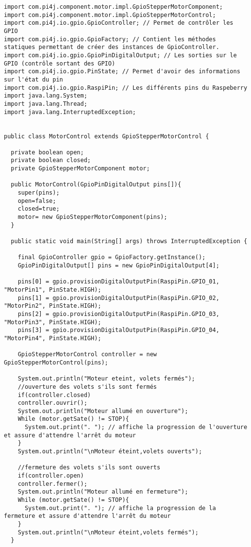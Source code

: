 \documentclass{article}
\newenvironment{DDbox}[1]{
\begin{lrbox}{\BBbox}\begin{minipage}{\linewidth}}
{\end{minipage}\end{lrbox}\noindent\colorbox{Zgris}{\usebox{\BBbox}} \\
[.5cm]}
\begin{document}
\begin{DDbox}{\linewidth}
\begin{lstlisting}
import com.pi4j.component.motor.impl.GpioStepperMotorComponent;
import com.pi4j.component.motor.impl.GpioStepperMotorControl;
import com.pi4j.io.gpio.GpioController; // Permet de contrôler les GPIO
import com.pi4j.io.gpio.GpioFactory; // Contient les méthodes statiques permettant de créer des instances de GpioController.
import com.pi4j.io.gpio.GpioPinDigitalOutput; // Les sorties sur le GPIO (contrôle sortant des GPIO)
import com.pi4j.io.gpio.PinState; // Permet d'avoir des informations sur l'état du pin
import com.pi4j.io.gpio.RaspiPin; // Les différents pins du Raspeberry
import java.lang.System;
import java.lang.Thread;
import java.lang.InterruptedException;


public class MotorControl extends GpioStepperMotorControl {

  private boolean open;
  private boolean closed;
  private GpioStepperMotorComponent motor;
  
  public MotorControl(GpioPinDigitalOutput pins[]){
    super(pins);
    open=false;
    closed=true;
    motor= new GpioStepperMotorComponent(pins);
  }
  
  public static void main(String[] args) throws InterruptedException {
    
    final GpioController gpio = GpioFactory.getInstance();
    GpioPinDigitalOutput[] pins = new GpioPinDigitalOutput[4];
    
    pins[0] = gpio.provisionDigitalOutputPin(RaspiPin.GPIO_01, "MotorPin1", PinState.HIGH);
    pins[1] = gpio.provisionDigitalOutputPin(RaspiPin.GPIO_02, "MotorPin2", PinState.HIGH);
    pins[2] = gpio.provisionDigitalOutputPin(RaspiPin.GPIO_03, "MotorPin3", PinState.HIGH);
    pins[3] = gpio.provisionDigitalOutputPin(RaspiPin.GPIO_04, "MotorPin4", PinState.HIGH);
    
    GpioStepperMotorControl controller = new GpioStepperMotorControl(pins);
    
    System.out.println("Moteur eteint, volets fermés");
    //ouverture des volets s'ils sont fermés
    if(controller.closed)
    controller.ouvrir();
    System.out.println("Moteur allumé en ouverture");
    While (motor.getSate() != STOP){
      System.out.print(". "); // affiche la progression de l'ouverture et assure d'attendre l'arrêt du moteur
    }
    System.out.println("\nMoteur éteint,volets ouverts");
    
    //fermeture des volets s'ils sont ouverts
    if(controller.open)
    controller.fermer();
    System.out.println("Moteur allumé en fermeture");
    While (motor.getSate() != STOP){
      System.out.print(". "); // affiche la progression de la fermeture et assure d'attendre l'arrêt du moteur
    }
    System.out.println("\nMoteur éteint,volets fermés"); 
  }
  
\end{lstlisting}
\end{DDbox} 
\end{document}

